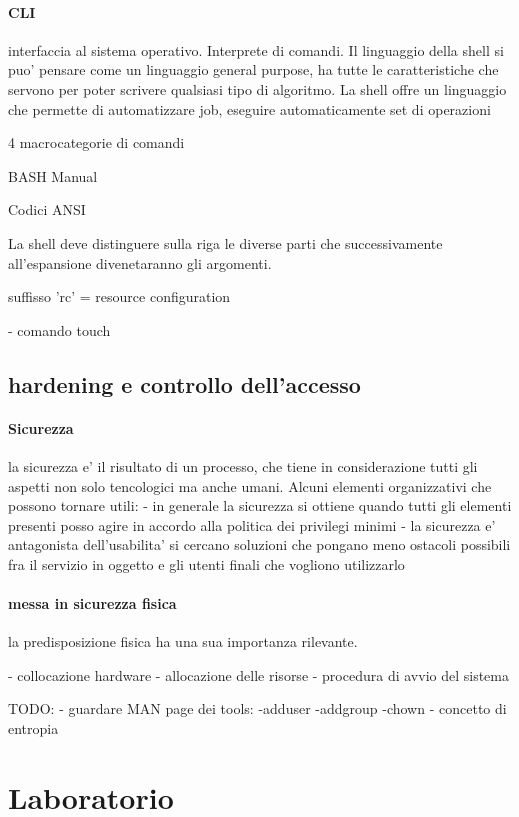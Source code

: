\documentclass[12pt]{article}
\begin{document}
			

			\paragraph{CLI}
			interfaccia al sistema operativo. Interprete di comandi. Il linguaggio della shell si puo' pensare come un linguaggio
			general purpose, ha tutte le caratteristiche che servono per poter scrivere qualsiasi tipo di algoritmo.
			La shell offre un linguaggio che permette di automatizzare job, eseguire automaticamente set di operazioni

			4 macrocategorie di comandi
			
			BASH Manual

			Codici ANSI


			La shell deve distinguere sulla riga le diverse parti che successivamente all'espansione divenetaranno gli argomenti.

			suffisso 'rc' = resource configuration

				- comando touch

			




	\subsection{hardening e controllo dell'accesso}
		\paragraph{Sicurezza} la sicurezza e' il risultato di un processo, che tiene in considerazione tutti gli aspetti non solo tencologici
		ma anche umani. Alcuni elementi organizzativi che possono tornare utili:
		- in generale la sicurezza si ottiene quando tutti gli elementi presenti posso agire in accordo alla politica dei privilegi minimi
		- la sicurezza e' antagonista dell'usabilita'
		si cercano soluzioni che pongano meno ostacoli possibili fra il servizio in oggetto e gli utenti finali che vogliono utilizzarlo

		\paragraph{messa in sicurezza fisica}
		la predisposizione fisica ha una sua importanza rilevante.

		- collocazione hardware
		- allocazione delle risorse
		- procedura di avvio del sistema
		
		TODO:
			- guardare MAN page dei tools:
				-adduser
				-addgroup
				-chown
			- concetto di entropia

	

	\section{Laboratorio}
	
	
	
\end{document}
